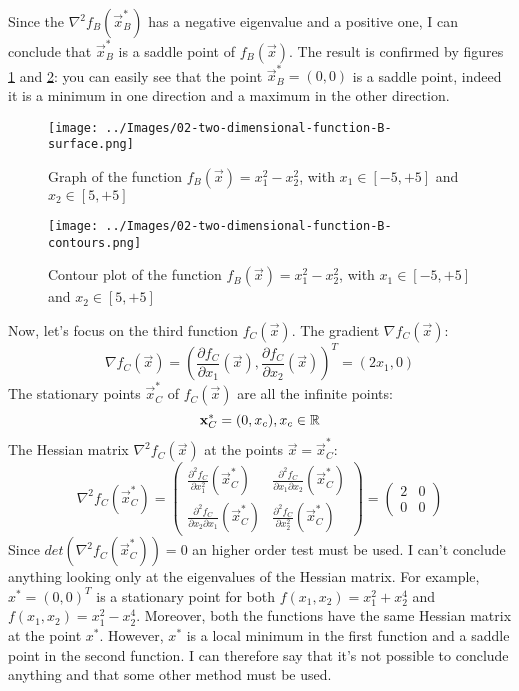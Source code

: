     Since the \(\nabla^2 f_B(\vec{x}_B^*)\) has a negative eigenvalue and a positive one, I can conclude that \(\vec{x}^*_B\) is a saddle point of \(f_B(\vec{x})\). The result is confirmed by figures \ref{two-dimensional-function-B-surface} and \ref{two-dimensional-function-B-contours}: you can easily see that the point \(\vec{x}_B^* = (0, 0)\) is a saddle point, indeed it is a minimum in one direction and a maximum in the other direction.\par
    \begin{figure}
        \centering
        \texttt{[image: ../Images/02-two-dimensional-function-B-surface.png]}
        \caption{Graph of the function \(f_B(\vec{x}) = x_{1}^{2} - x_{2}^{2}\), with \(x_1 \in [-5, +5]\) and \(x_2 \in [5, +5]\)}
        \label{two-dimensional-function-B-surface}
    \end{figure}
    \begin{figure}
        \centering
        \texttt{[image: ../Images/02-two-dimensional-function-B-contours.png]}
        \caption{Contour plot of the function \(f_B(\vec{x}) = x_{1}^{2} - x_{2}^{2}\), with \(x_1 \in [-5, +5]\) and \(x_2 \in [5, +5]\)}
        \label{two-dimensional-function-B-contours}
    \end{figure}
    Now, let's focus on the third function \(f_C(\vec{x})\). The gradient \(\nabla f_C(\vec{x})\):
    \[\nabla f_C(\vec{x}) = \left (\frac{\partial f_C}{\partial x_1}(\vec{x}), \frac{\partial f_C}{\partial x_2}(\vec{x}) \right )^T = (2x_1, 0)\]
    The stationary points \(\vec{x}_C^*\) of \(f_C(\vec{x})\) are all the infinite points:
    \[\mathbf{x}_C^* = (0, x_c), x_c \in \mathbb{R}\]
    The Hessian matrix \(\nabla^2 f_C(\vec{x})\) at the points \(\vec{x} = \vec{x}_C^*\):
    \[
        \nabla^2 f_C(\vec{x}_C^*) =
        \begin{pmatrix}
            \frac{\partial^2 f_C}{\partial x_1^2}(\vec{x}^*_C) &
            \frac{\partial^2 f_C}{\partial x_1 \partial x_2}(\vec{x}^*_C) \\
            \frac{\partial^2 f_C}{\partial x_2 \partial x_1}(\vec{x}^*_C) &
            \frac{\partial^2 f_C}{\partial x_2^2}(\vec{x}^*_C)
        \end{pmatrix}
        =
        \begin{pmatrix}
            2 & 0 \\
            0 & 0
        \end{pmatrix}
    \]
    Since \(det(\nabla^2 f_C(\vec{x}_C^*)) = 0\) an higher order test must be used. I can't conclude anything looking only at the eigenvalues of the Hessian matrix. For example, \(x^* = (0, 0)^T\) is a stationary point for both \(f(x_1, x_2) = x_1^2 + x_2^4\) and \(f(x_1, x_2) = x_1^2 - x_2^4\). Moreover, both the functions have the same Hessian matrix at the point \(x^*\). However, \(x^*\) is a local minimum in the first function and a saddle point in the second function. I can therefore say that it's not possible to conclude anything and that some other method must be used.\\
